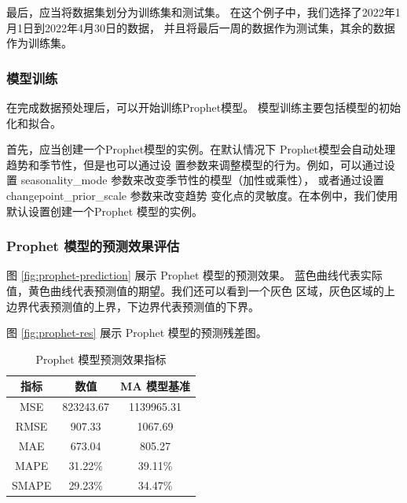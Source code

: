 \documentclass[a4paper,AutoFakeBold,oneside,12pt]{book}
\begin{document}
最后，应当将数据集划分为训练集和测试集。
在这个例子中，我们选择了2022年1月1日到2022年4月30日的数据，
并且将最后一周的数据作为测试集，其余的数据作为训练集。

\subsubsection{模型训练}

在完成数据预处理后，可以开始训练Prophet模型。
模型训练主要包括模型的初始化和拟合。

首先，应当创建一个Prophet模型的实例。在默认情况下
Prophet模型会自动处理趋势和季节性，但是也可以通过设
置参数来调整模型的行为。例如，可以通过设置 
seasonality\_mode 参数来改变季节性的模型（加性或乘性），
或者通过设置 changepoint\_prior\_scale 参数来改变趋势
变化点的灵敏度。在本例中，我们使用默认设置创建一个Prophet
模型的实例。

\subsubsection{Prophet 模型的预测效果评估}

图 \ref{fig:prophet-prediction} 展示 Prophet 模型的预测效果。
蓝色曲线代表实际值，黄色曲线代表预测值的期望。我们还可以看到一个灰色
区域，灰色区域的上边界代表预测值的上界，下边界代表预测值的下界。


图 \ref{fig:prophet-res} 展示 Prophet 模型的预测残差图。


\begin{table}[h]
    \centering
    \caption{Prophet 模型预测效果指标}
    \label{table:prophet_evaluation_metrics}
    \begin{tabular}{c|c|c}
        \hline
        \textbf{指标} & \textbf{数值} & \textbf{MA 模型基准} \\
        \hline
        MSE & 823243.67 & 1139965.31 \\
        RMSE & 907.33 & 1067.69 \\
        MAE & 673.04 & 805.27 \\
        MAPE & 31.22\% & 39.11\% \\
        SMAPE & 29.23\% & 34.47\% \\
        \hline
    \end{tabular}
\end{table}
\end{document}
